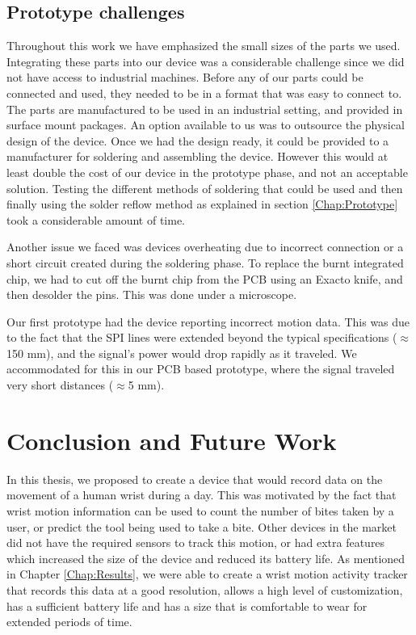 \section{Prototype challenges}
\label{Sec:ProtoChall}
Throughout this work we have emphasized the small sizes of the parts we used.
Integrating these parts into our device was a considerable challenge since we did not have access to industrial machines.
Before any of our parts could be connected and used,
they needed to be in a format that was easy to connect to.
The parts are manufactured to be used in an industrial setting,
and provided in surface mount packages.
An option available to us was to outsource the physical design of the device.
Once we had the design ready,
it could be provided to a manufacturer for soldering and assembling the device.
However this would at least double the cost of our device in the prototype phase, 
and not an acceptable solution.
Testing the different methods of soldering that could be used and then finally using
the solder reflow method as explained in section \ref{Chap:Prototype}
took a considerable amount of time.

Another issue we faced was devices overheating due to incorrect connection or a short circuit
created during the soldering phase.
To replace the burnt integrated chip,
we had to cut off the burnt chip from the PCB using an Exacto knife,
and then desolder the pins. This was done under a microscope.

Our first prototype had the device reporting incorrect motion data.
This was due to the fact that the SPI lines were extended beyond the typical specifications ($\approx$150 mm),
and the signal's power would drop rapidly as it traveled.
We accommodated for this in our PCB based prototype,
where the signal traveled very short distances ($\approx$5 mm).

\chapter{Conclusion and Future Work}
\label{Chap:Concl}
In this thesis, we proposed to create a device that would record data on 
the movement of a human wrist during a day.
This was motivated by the fact that wrist motion information can be used to count the number of bites
taken by a user,
or predict the tool being used to take a bite.
Other devices in the market did not have the required sensors to track this motion,
or had extra features which increased the size of the device and reduced its battery life.
As mentioned in Chapter \ref{Chap:Results},
we were able to create a wrist motion activity tracker that records this data at a good resolution,
allows a high level of customization,
has a sufficient battery life and has a size that is comfortable to wear for extended periods of time.

